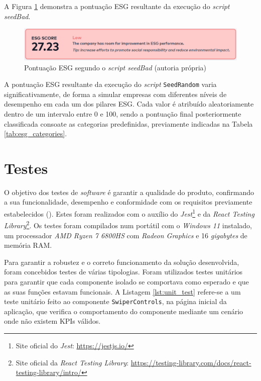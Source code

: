 A Figura \ref{fig:bad_esg} demonstra a pontuação ESG resultante da execução do \textit{script seedBad}.

\begin{figure}[H]
    \centering
    \includegraphics[width=\linewidth,keepaspectratio]{frontmatter/assets/platform_prints/seeding/bad_esg.png}
    \caption{Pontuação ESG segundo o \textit{script seedBad} (autoria própria)}
    \label{fig:bad_esg}
\end{figure}

A pontuação ESG resultante da execução do \textit{script} \texttt{SeedRandom} varia significativamente, de forma a simular empresas com diferentes níveis de desempenho em cada um dos pilares ESG. Cada valor é atribuído aleatoriamente dentro de um intervalo entre 0 e 100, sendo a pontuação final posteriormente classificada consoate as categorias predefinidas, previamente indicadas na Tabela \ref{tab:esg_categories}.

\section{Testes}

O objetivo dos testes de \textit{software} é garantir a qualidade do produto, confirmando a sua funcionalidade, desempenho e conformidade com os requisitos previamente estabelecidos (\cite{softdesing2025}). Estes foram realizados com o auxílio do \textit{Jest}\footnote{Site oficial do \textit{Jest}: \url{https://jestjs.io/}} e da \textit{React Testing Library}\footnote{Site oficial da \textit{React Testing Library}: \url{https://testing-library.com/docs/react-testing-library/intro/}}. Os testes foram compilados num portátil com o \textit{Windows 11} instalado, um processador \textit{AMD Ryzen 7 6800HS} com \textit{Radeon Graphics} e 16 \textit{gigabytes} de memória RAM.

Para garantir a robustez e o correto funcionamento da solução desenvolvida, foram concebidos testes de várias tipologias. Foram utilizados testes unitários para garantir que cada componente isolado se comportava como esperado e que as suas funções estavam funcionais. A Listagem \ref{lst:unit_test} refere-se a um teste unitário feito ao componente \texttt{SwiperControls}, na página inicial da aplicação, que verifica o comportamento do componente mediante um cenário onde não existem KPIs válidos.

